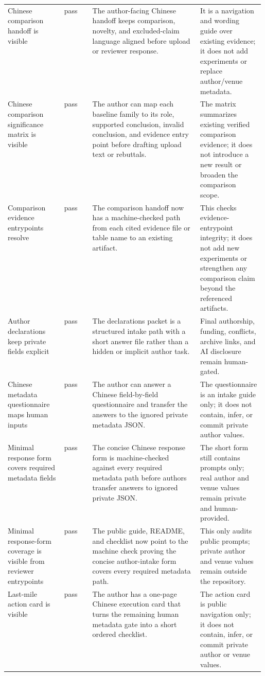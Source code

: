 \begin{tabularx}{\linewidth}{>{\raggedright\arraybackslash}p{0.22\linewidth}>{\raggedright\arraybackslash}p{0.11\linewidth}>{\raggedright\arraybackslash}X>{\raggedright\arraybackslash}p{0.25\linewidth}}
Chinese comparison handoff is visible & pass & The author-facing Chinese handoff keeps comparison, novelty, and excluded-claim language aligned before upload or reviewer response. & It is a navigation and wording guide over existing evidence; it does not add experiments or replace author/venue metadata. \\
Chinese comparison significance matrix is visible & pass & The author can map each baseline family to its role, supported conclusion, invalid conclusion, and evidence entry point before drafting upload text or rebuttals. & The matrix summarizes existing verified comparison evidence; it does not introduce a new result or broaden the comparison scope. \\
Comparison evidence entrypoints resolve & pass & The comparison handoff now has a machine-checked path from each cited evidence file or table name to an existing artifact. & This checks evidence-entrypoint integrity; it does not add new experiments or strengthen any comparison claim beyond the referenced artifacts. \\
Author declarations keep private fields explicit & pass & The declarations packet is a structured intake path with a short answer file rather than a hidden or implicit author task. & Final authorship, funding, conflicts, archive links, and AI disclosure remain human-gated. \\
Chinese metadata questionnaire maps human inputs & pass & The author can answer a Chinese field-by-field questionnaire and transfer the answers to the ignored private metadata JSON. & The questionnaire is an intake guide only; it does not contain, infer, or commit private author values. \\
Minimal response form covers required metadata fields & pass & The concise Chinese response form is machine-checked against every required metadata path before authors transfer answers to ignored private JSON. & The short form still contains prompts only; real author and venue values remain private and human-provided. \\
Minimal response-form coverage is visible from reviewer entrypoints & pass & The public guide, README, and checklist now point to the machine check proving the concise author-intake form covers every required metadata path. & This only audits public prompts; private author and venue values remain outside the repository. \\
Last-mile action card is visible & pass & The author has a one-page Chinese execution card that turns the remaining human metadata gate into a short ordered checklist. & The action card is public navigation only; it does not contain, infer, or commit private author or venue values. \\

\end{tabularx}
